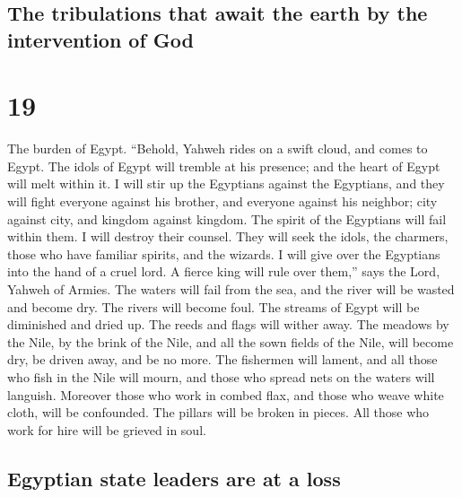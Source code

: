 \hypertarget{the-tribulations-that-await-the-earth-by-the-intervention-of-god}{%
\subsection{The tribulations that await the earth by the intervention of
God}\label{the-tribulations-that-await-the-earth-by-the-intervention-of-god}}

\hypertarget{section-18}{%
\section{19}\label{section-18}}

 The burden of Egypt. ``Behold, Yahweh rides on a swift
cloud, and comes to Egypt. The idols of Egypt will tremble at his
presence; and the heart of Egypt will melt within it.  I
will stir up the Egyptians against the Egyptians, and they will fight
everyone against his brother, and everyone against his neighbor; city
against city, and kingdom against kingdom.  The spirit of
the Egyptians will fail within them. I will destroy their counsel. They
will seek the idols, the charmers, those who have familiar spirits, and
the wizards.  I will give over the Egyptians into the hand
of a cruel lord. A fierce king will rule over them,'' says the Lord,
Yahweh of Armies.  The waters will fail from the sea, and
the river will be wasted and become dry.  The rivers will
become foul. The streams of Egypt will be diminished and dried up. The
reeds and flags will wither away.  The meadows by the
Nile, by the brink of the Nile, and all the sown fields of the Nile,
will become dry, be driven away, and be no more.  The
fishermen will lament, and all those who fish in the Nile will mourn,
and those who spread nets on the waters will languish. 
Moreover those who work in combed flax, and those who weave white cloth,
will be confounded.  The pillars will be broken in
pieces. All those who work for hire will be grieved in soul.

\hypertarget{egyptian-state-leaders-are-at-a-loss}{%
\subsection{Egyptian state leaders are at a
loss}\label{egyptian-state-leaders-are-at-a-loss}}

